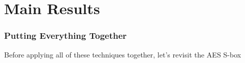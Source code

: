 \documentclass[10pt]{beamer}
\begin{document}








\section{Main Results}
\begin{frame}
	\frametitle{Putting Everything Together}
	\begin{center}
		Before applying all of these techniques together, let's revisit the AES S-box
	\end{center}
\end{frame}
\end{document}
